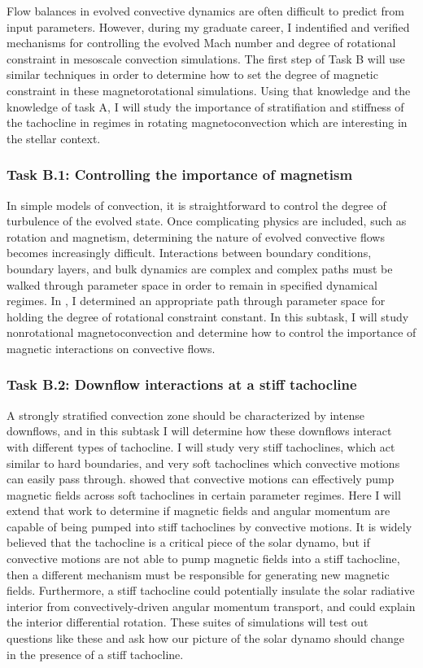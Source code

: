 \documentclass[aasms,12pt]{article}
\begin{document}
Flow balances in evolved convective dynamics are often difficult to predict from input parameters.
However, during my graduate career, I indentified and verified mechanisms for controlling the evolved Mach number \citep{anders&brown2017} and degree of rotational constraint \citep[][and Fig. \ref{fig:rossby_plot}]{anders&all2019} in mesoscale convection simulations.
The first step of Task B will use similar techniques in order to determine how to set the degree of magnetic constraint in these magnetorotational simulations.
Using that knowledge and the knowledge of task A, I will study the importance of stratifiation and stiffness of the tachocline in regimes in rotating magnetoconvection which are interesting in the stellar context.

\subsubsection{Task B.1: Controlling the importance of magnetism}
In simple models of convection, it is straightforward to control the degree of turbulence of the evolved state.
Once complicating physics are included, such as rotation and magnetism, determining the nature of evolved convective flows becomes increasingly difficult.
Interactions between boundary conditions, boundary layers, and bulk dynamics are complex and complex paths must be walked through parameter space in order to remain in specified dynamical regimes.
In \citet{anders&all2019}, I determined an appropriate path through parameter space for holding the degree of rotational constraint constant.
In this subtask, I will study nonrotational magnetoconvection and determine how to control the importance of magnetic interactions on convective flows.

\subsubsection{Task B.2: Downflow interactions at a stiff tachocline}
A strongly stratified convection zone should be characterized by intense downflows, and in this subtask I will determine how these downflows interact with different types of tachocline.
I will study very stiff tachoclines, which act similar to hard boundaries, and very soft tachoclines which convective motions can easily pass through.
\citet{tobias&all1998} showed that convective motions can effectively pump magnetic fields across soft tachoclines in certain parameter regimes.
Here I will extend that work  to determine if magnetic fields and angular momentum are capable of being pumped into stiff tachoclines by convective motions.
It is widely believed that the tachocline is a critical piece of the solar dynamo, but if convective motions are not able to pump magnetic fields into a stiff tachocline, then a different mechanism must be responsible for generating new magnetic fields.
Furthermore, a stiff tachocline could potentially insulate the solar radiative interior from convectively-driven angular momentum transport, and could explain the interior differential rotation.
These suites of simulations will test out questions like these and ask how our picture of the solar dynamo should change in the presence of a stiff tachocline.
\end{document}
